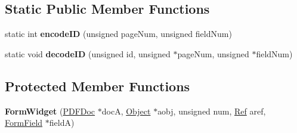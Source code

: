 \subsection*{Static Public Member Functions}
\begin{DoxyCompactItemize}
\item 
\mbox{\label{class_form_widget_a43c495d1758b199cd19995b48b3c4d7b}} 
static int {\bfseries encode\+ID} (unsigned page\+Num, unsigned field\+Num)
\item 
\mbox{\label{class_form_widget_a9465845c79fe0bdc7898fdd430cb6d9b}} 
static void {\bfseries decode\+ID} (unsigned id, unsigned $\ast$page\+Num, unsigned $\ast$field\+Num)
\end{DoxyCompactItemize}
\subsection*{Protected Member Functions}
\begin{DoxyCompactItemize}
\item 
\mbox{\label{class_form_widget_aba785771940c482741290037eba46ec5}} 
{\bfseries Form\+Widget} (\hyperlink{class_p_d_f_doc}{P\+D\+F\+Doc} $\ast$docA, \hyperlink{class_object}{Object} $\ast$aobj, unsigned num, \hyperlink{struct_ref}{Ref} aref, \hyperlink{class_form_field}{Form\+Field} $\ast$fieldA)
\end{DoxyCompactItemize}
